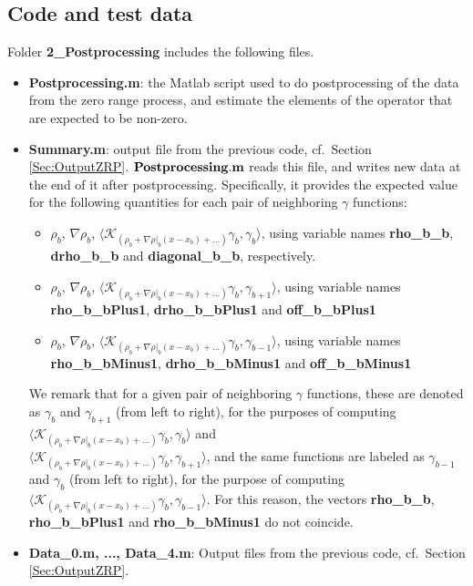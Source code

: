 \documentclass[authoryear,3p,11pt]{elsarticle}
\begin{document}
\subsection{Code and test data} \label{Sec:PostCode}
Folder {\bf 2\_Postprocessing} includes the following files.
\begin{itemize}
\item {\bf Postprocessing.m}: the Matlab script used to do postprocessing of the data from the zero range process, and estimate the elements of the operator that are expected to be non-zero.
\item {\bf Summary.m}: output file from the previous code, cf.~Section \ref{Sec:OutputZRP}. $\bf Postprocessing.m$ reads this file, and writes new data at the end of it after postprocessing. Specifically, it provides the expected value for the following quantities for each pair of neighboring $\gamma$ functions: 
 \begin{itemize}
 \item[] $\rho_b$, $\nabla \rho_b$, $\langle  \mathcal{K}_{\left(\rho_b+ \nabla \rho|_b (x-x_b) +\ldots\right)}\gamma_b,\gamma_b \rangle$, using variable names {\bf rho\_b\_b},  {\bf drho\_b\_b} and {\bf diagonal\_b\_b}, respectively.
    \item[] $\rho_b$, $\nabla \rho_b$, $\langle \mathcal{K}_{\left(\rho_b+ \nabla \rho|_b (x-x_b) +\ldots\right)} \gamma_b,\gamma_{b+1} \rangle$, using variable names {\bf rho\_b\_bPlus1}, {\bf drho\_b\_bPlus1} and {\bf off\_b\_bPlus1}
  \item[] $\rho_b$, $\nabla \rho_b$, $\langle \mathcal{K}_{\left(\rho_b+ \nabla \rho|_b (x-x_b) +\ldots\right)} \gamma_b,\gamma_{b-1} \rangle$, using variable names {\bf rho\_b\_bMinus1}, {\bf drho\_b\_bMinus1} and {\bf off\_b\_bMinus1}
 \end{itemize}
 We remark that for a given pair of neighboring $\gamma$ functions, these are denoted as $\gamma_b$ and $\gamma_{b+1}$ (from left to right), for the purposes of computing $\langle  \mathcal{K}_{\left(\rho_b+ \nabla \rho|_b (x-x_b) +\ldots\right)}\gamma_b,\gamma_b \rangle$ and \\ $\langle \mathcal{K}_{\left(\rho_b+ \nabla \rho|_b (x-x_b) +\ldots\right)} \gamma_b,\gamma_{b+1} \rangle$, and the same functions are labeled as $\gamma_{b-1}$ and $\gamma_b$ (from left to right), for the purpose of computing $\langle \mathcal{K}_{\left(\rho_b+ \nabla \rho|_b (x-x_b) +\ldots\right)} \gamma_b,\gamma_{b-1} \rangle$. For this reason, the vectors {\bf rho\_b\_b}, {\bf rho\_b\_bPlus1} and {\bf rho\_b\_bMinus1} do not coincide.
\item {\bf Data\_0.m, ..., Data\_4.m}: Output files from the previous code, cf.~Section \ref{Sec:OutputZRP}. 
\end{itemize}
\end{document}
